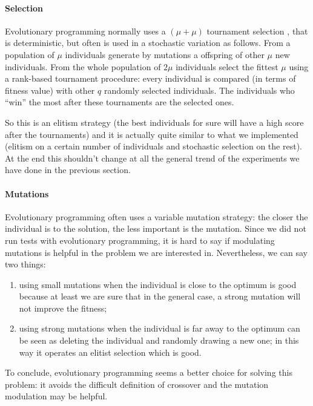 \documentclass{report}
\begin{document}
\paragraph{Selection}
Evolutionary programming normally uses a $(\mu + \mu)$ tournament selection \cite{introtoec}, that is deterministic, but often is used in a stochastic variation as follows. From a population of $\mu$ individuals generate by mutations a offspring of other $\mu$ new individuals. From the whole population of $2\mu$ individuals select the fittest $\mu$ using a rank-based tournament procedure: every individual is compared (in terms of fitness value) with other $q$ randomly selected individuals. The individuals who ``win'' the most after these tournaments are the selected ones. 

So this is an elitism strategy (the best individuals for sure will have a high score after the tournaments) and it is actually quite similar to what we implemented (elitism on a certain number of individuals and stochastic selection on the rest). At the end this shouldn't change at all the general trend of the experiments we have done in the previous section.

\paragraph{Mutations}
Evolutionary programming often uses a variable mutation strategy: the closer the individual is to the solution, the less important is the mutation. Since we did not run tests with evolutionary programming, it is hard to say if modulating mutations is helpful in the problem we are interested in. Nevertheless, we can say two things:
\begin{enumerate}
\item using small mutations when the individual is close to the optimum is good because at least we are sure that in the general case, a strong mutation will not improve the fitness;
\item using strong mutations when the individual is far away to the optimum can be seen as deleting the individual and randomly drawing a new one; in this way it operates an elitist selection which is good.
\end{enumerate}



To conclude, evolutionary programming seems a better choice for solving this problem: it avoids the difficult definition of crossover and the mutation modulation may be helpful.



\end{document}
